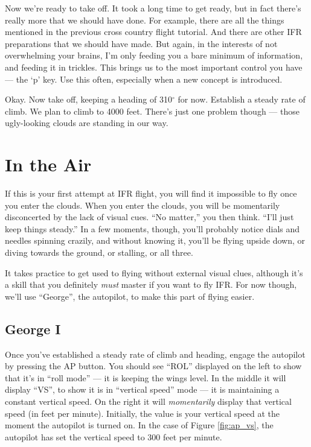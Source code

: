 Now we're ready to take off.  It took a long time to get ready, but in
fact there's really more that we should have done.  For example, there
are all the things mentioned in the previous cross country flight
tutorial.  And there are other IFR preparations that we should have
made.  But again, in the interests of not overwhelming your brains,
I'm only feeding you a bare minimum of information, and feeding it in
trickles.  This brings us to the most important control you have ---
the `p' key.  Use this often, especially when a new concept is
introduced.

Okay.  Now take off, keeping a heading of 310$^\circ$ for
now.  Establish
a steady rate of climb.  We plan to climb to 4000 feet.  There's just
one problem though --- those ugly-looking clouds are standing in our
way.

\section{In the Air}

If this is your first attempt at IFR flight, you will find it
impossible to fly once you enter the clouds.  When you enter the
clouds, you will be momentarily disconcerted by the lack of visual
cues.  ``No matter,'' you then think.  ``I'll just keep things
steady.''  In a few moments, though, you'll probably notice dials and
needles spinning crazily, and without knowing it, you'll be flying
upside down, or diving towards the ground, or stalling, or all three.

It takes practice to get used to flying without external visual clues,
although it's a skill that you definitely \emph{must} master if you
want to fly IFR.  For now though, we'll use ``George'', the autopilot,
to make this part of flying easier.

\subsection{George I}

Once you've established a steady rate of climb and heading, engage the
autopilot by pressing the AP button.  You should see ``ROL'' displayed
on the left to show that it's in ``roll mode'' --- it is keeping the
wings level.  In the middle it will display ``VS'', to show it is in
``vertical speed'' mode --- it is maintaining a constant vertical
speed.  On the right it will \emph{momentarily} display that vertical
speed (in feet per minute).  Initially, the value is your vertical
speed at the moment the autopilot is turned on.  In the case of Figure
\ref{fig:ap_vs}, the autopilot has set the vertical speed to 300 feet
per minute.

